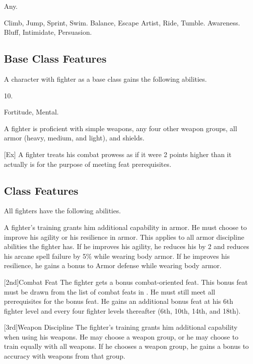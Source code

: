 
 Any.

 Climb, Jump, Sprint, Swim.
 Balance, Escape Artist, Ride, Tumble.
 Awareness.
 Bluff, Intimidate, Persuasion.

\subsection{Base Class Features}
A character with fighter as a base class gains the following abilities.

 10.

  Fortitude,  Mental.

 A fighter is proficient with simple weapons, any four other weapon groups,  all armor (heavy, medium, and light), and shields.

[Ex]
A fighter treats his combat prowess as if it were 2 points higher than it actually is for the purpose of meeting feat prerequisites.

\subsection{Class Features}
All fighters have the following abilities.

A fighter's training grants him additional capability in armor.
He must choose to improve his agility or his resilience in armor.
This applies to all armor discipline abilities the fighter has.
If he improves his agility, he reduces his  by 2 and reduces his arcane spell failure by 5\% while wearing body armor.
If he improves his resilience, he gains a  bonus to Armor defense while wearing body armor.

[2nd]{Combat Feat}
The fighter gets a bonus combat-oriented feat.
This bonus feat must be drawn from the list of combat feats in .
He must still meet all prerequisites for the bonus feat.
He gains an additional bonus feat at his 6th fighter level and every four fighter levels thereafter (6th, 10th, 14th, and 18th).

[3rd]{Weapon Discipline}
The fighter's training grants him additional capability when using his weapons.
He may choose a weapon group, or he may choose to train equally with all weapons.
If he chooses a weapon group, he gains a  bonus to accuracy with weapons from that group.

